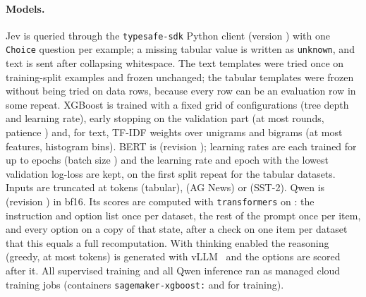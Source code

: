\paragraph{Models.}
Jev is queried through the \texttt{typesafe-sdk} Python client (version \SdkVersion) with one
\texttt{Choice} question per example; a missing tabular value is written as \texttt{unknown}, and
text is sent after collapsing whitespace. The text templates were tried once on
\TemplateCheckN{} training-split examples and frozen unchanged; the tabular templates were frozen
without being tried on data rows, because every row can be an evaluation row in some repeat.
XGBoost is trained with a fixed grid of \XgbGridSize{} configurations (tree depth and learning
rate), early stopping on the validation part (at most \XgbMaxRounds{} rounds, patience
\XgbPatience) and, for text, TF-IDF weights over unigrams and bigrams (at most \TfidfFeatures{}
features, \XgbTextBins{} histogram bins). BERT is \texttt{\BertModelId} (revision
\texttt{\BertRevision}); learning rates \BertLearningRates{} are each trained for up to
\BertMaxEpochs{} epochs (batch size \BertBatchSize) and the learning rate and epoch with the
lowest validation log-loss are kept, on the first split repeat for the tabular datasets. Inputs
are truncated at \BertMaxLengthGerman{} tokens (tabular), \BertMaxLengthAgnews{} (AG News) or
\BertMaxLengthSst{} (SST-2). Qwen is \texttt{\QwenModelId} (revision \texttt{\QwenRevision}) in
bf16. Its scores are computed with \texttt{transformers} \QwenTransformersVersion{} on
\texttt{\QwenScoringInstance}: the instruction and option list once per dataset, the rest of the
prompt once per item, and every option on a copy of that state, after a check on one item per
dataset that this equals a full recomputation. With thinking enabled the reasoning (greedy, at
most \ThinkMaxTokens{} tokens) is generated with vLLM~\citep{kwon2023vllm} \QwenVllmVersion{} and
the options are scored after it. All supervised training and all Qwen inference ran as managed
cloud training jobs (containers \texttt{sagemaker-xgboost:\XgbImageTag} and \breaktt{\BertImage}
for training).

\begin{table}[H]
  \caption{Labels used by each model, per split repeat. ``Early stopping, selection'' counts the
    validation labels used for early stopping and hyperparameter selection. Threshold selection
    applies to the binary datasets and reuses validation labels. The escalation threshold is
    selected on validation items predicted by both zero-shot models.}
  \label{tab:labels}
  \centering\small
  \fittable{}
\end{table}

